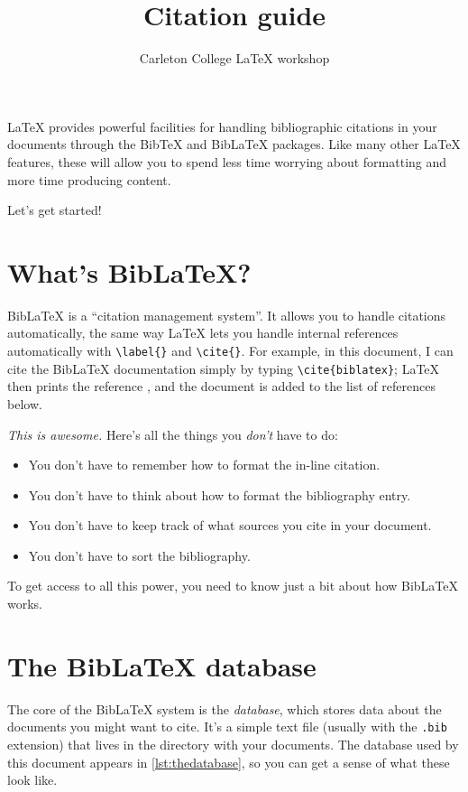 \documentclass{article}
\title{Citation guide}
\author{Carleton College \LaTeX{} workshop}
\date{}
\newcommand*{\code}[1]{\texttt{#1}}
\begin{document}
\maketitle

\LaTeX{} provides powerful facilities for handling bibliographic citations in your documents through the Bib\TeX{} and Bib\LaTeX{} packages.
Like many other \LaTeX{} features, these will allow you to spend less time worrying about formatting and more time producing content.

Let's get started!

\section{What's Bib\LaTeX{}?}
\label{s:whatis}
Bib\LaTeX{} is a \enquote{citation management system}.
It allows you to handle citations automatically, the same way \LaTeX{} lets you handle internal references automatically with \code{\textbackslash{}label\{\}} and \code{\textbackslash{}cite\{\}}.
For example, in this document, I can cite the Bib\LaTeX{} documentation simply by typing \code{\textbackslash{}cite\{biblatex\}}; \LaTeX{} then prints the reference \cite{biblatex}, and the document is added to the list of references below.

\emph{This is awesome.}
Here's all the things you \emph{don't} have to do:
\begin{itemize}
\item
  You don't have to remember how to format the in-line citation.

\item
  You don't have to think about how to format the bibliography entry.

\item
  You don't have to keep track of what sources you cite in your document.

\item
  You don't have to sort the bibliography.
\end{itemize}

To get access to all this power, you need to know just a bit about how Bib\LaTeX{} works.

\section{The Bib\LaTeX{} database}
\label{s:database}
The core of the Bib\LaTeX{} system is the \emph{database}, which stores data about the documents you might want to cite.
It's a simple text file (usually with the \code{.bib} extension) that lives in the directory with your documents.
The database used by this document appears in \cref{lst:thedatabase}, so you can get a sense of what these look like.
\end{document}
